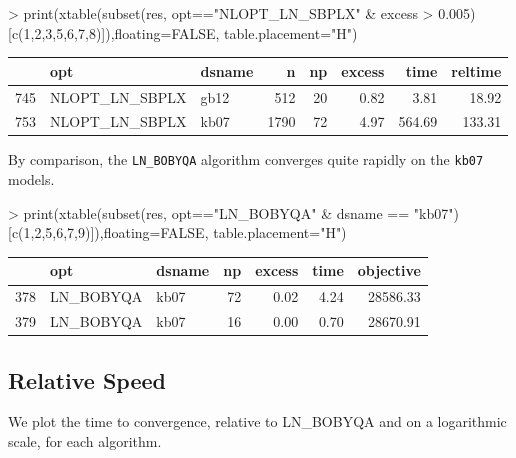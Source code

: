 \documentclass[article]{jss}
\begin{document}
\begin{Schunk}
\begin{Sinput}
> print(xtable(subset(res, opt=="NLOPT_LN_SBPLX" & excess > 0.005)[c(1,2,3,5,6,7,8)]),floating=FALSE, table.placement="H")
\end{Sinput}
\begin{tabular}{rllrrrrr}
  \hline
 & opt & dsname & n & np & excess & time & reltime \\ 
  \hline
745 & NLOPT\_LN\_SBPLX & gb12 & 512 &  20 & 0.82 & 3.81 & 18.92 \\ 
  753 & NLOPT\_LN\_SBPLX & kb07 & 1790 &  72 & 4.97 & 564.69 & 133.31 \\ 
   \hline
\end{tabular}\end{Schunk}

  
    By comparison, the \texttt{LN\_BOBYQA} algorithm converges quite rapidly
on the \texttt{kb07} models.
     
        
\begin{Schunk}
\begin{Sinput}
> print(xtable(subset(res, opt=="LN_BOBYQA" & dsname == "kb07")[c(1,2,5,6,7,9)]),floating=FALSE, table.placement="H")
\end{Sinput}
\begin{tabular}{rllrrrr}
  \hline
 & opt & dsname & np & excess & time & objective \\ 
  \hline
378 & LN\_BOBYQA & kb07 &  72 & 0.02 & 4.24 & 28586.33 \\ 
  379 & LN\_BOBYQA & kb07 &  16 & 0.00 & 0.70 & 28670.91 \\ 
   \hline
\end{tabular}\end{Schunk}

\subsection[Relative Speed]{Relative Speed}

We plot the time to convergence, relative to LN_BOBYQA and on a logarithmic scale, for each algorithm.
\end{document}
